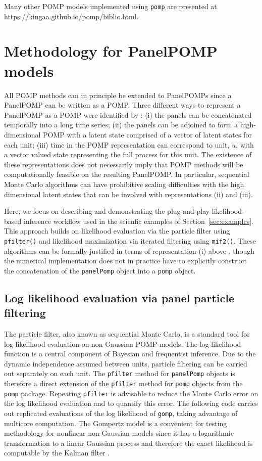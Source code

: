 \documentclass[12pt]{article}\usepackage[]{graphicx}\usepackage[table]{xcolor}
\newcommand\code{\texttt}
\newcommand\pomp{\texttt{pomp}\xspace}
\begin{document}
Many other POMP models implemented using \code{pomp} are presented at \url{https://kingaa.github.io/pomp/biblio.html}.


\section{Methodology for PanelPOMP models} \label{sec:meth}

All POMP methods can in principle be extended to PanelPOMPs since a PanelPOMP can be written as a POMP.
Three different ways to represent a PanelPOMP as a POMP were identified by \citet{romero-severson15}:
(i) the panels can be concatenated temporally into a long time series; (ii) the panels can be adjoined to form a high-dimensional POMP with a latent state comprised of a vector of latent states for each unit; (iii) time in the POMP representation can correspond to unit, $u$, with a vector valued state representing the full process for this unit.
The existence of these representations does not necessarily imply that POMP methods will be computationally feasible on the resulting PanelPOMP.
In particular, sequential Monte Carlo algorithms can have prohibitive scaling difficulties with the high dimensional latent states that can be involved with representations (ii) and (iii).

Here, we focus on describing and demonstrating the plug-and-play likelihood-based inference workflow used in the scienfic examples of Section~\ref{sec:examples}.
This approach builds on likelihood evaluation via the particle filter using \code{pfilter()} and likelihood maximization via iterated filtering using \code{mif2()}.
These algorithms can be formally justified in terms of representation (i) above \citep{breto19}, though the numerical implementation does not in practice have to explicitly construct the concatenation of the \code{panelPomp} object into a \code{pomp} object.

\subsection{Log likelihood evaluation via panel particle filtering}

The particle filter, also known as sequential Monte Carlo, is a standard tool for log likelihood evaluation on non-Gaussian POMP models.
The log likelihood function is a central component of Bayesian and frequentist inference.
Due to the dynamic independence assumed between units, particle filtering can be carried out separately on each unit.
The \code{pfilter} method for \code{panelPomp} objects is therefore a direct extension of the \code{pfilter} method for \code{pomp} objects from the \pomp package.
Repeating \code{pfilter} is advisable to reduce the Monte Carlo error on the log likelihood evaluation and to quantify this error.
The following code carries out replicated evaluations of the log likelihood of \code{gomp}, taking advantage of multicore computation.
The Gompertz model is a convenient for testing methodology for nonlinear non-Gaussian models since it has a logarithmic transformation to a linear Gaussian process and therefore the exact likelihood is computable by the Kalman filter \citep{king16}.
\end{document}
